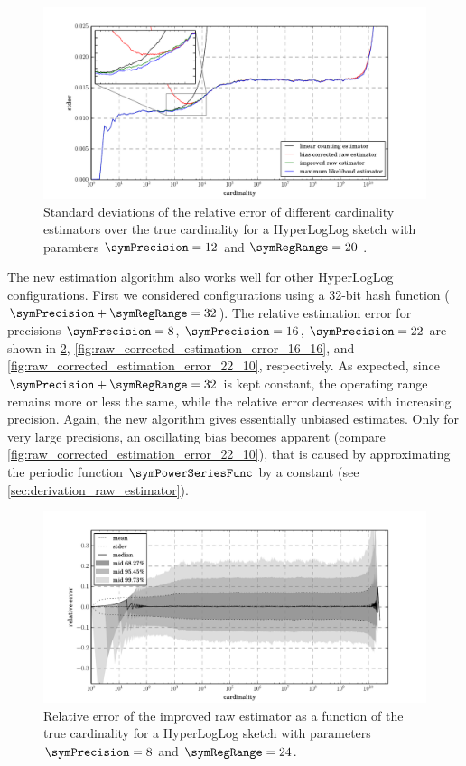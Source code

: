 \documentclass[a4paper]{scrartcl}
\begin{document}
\begin{figure}
\centering
\includegraphics[width=1\textwidth]{stdev_comparison}
\caption{Standard deviations of the relative error of different cardinality estimators over the true cardinality for a HyperLogLog sketch with paramters $\symPrecision = 12$ and $\symRegRange=20$ .}
\label{fig:stdev_comparison}
\end{figure}

The new estimation algorithm also works well for other HyperLogLog configurations. First we considered configurations using a 32-bit hash function ($\symPrecision + \symRegRange = 32$). The relative estimation error for precisions $\symPrecision=8$, $\symPrecision=16$, $\symPrecision=22$ are shown in \cref{fig:raw_corrected_estimation_error_8_24}, \cref{fig:raw_corrected_estimation_error_16_16}, and \cref{fig:raw_corrected_estimation_error_22_10}, respectively. As expected, since  $\symPrecision + \symRegRange = 32$ is kept constant, the operating range remains more or less the same, while the relative error decreases with increasing precision. Again, the new algorithm gives essentially unbiased estimates. Only for very large precisions, an oscillating bias becomes apparent (compare \cref{fig:raw_corrected_estimation_error_22_10}), that is caused by approximating the periodic function $\symPowerSeriesFunc$ by a constant (see \cref{sec:derivation_raw_estimator}).

\begin{figure}
\centering
\includegraphics[width=1\textwidth]{raw_corrected_estimate_8_24}
\caption{Relative error of the improved raw estimator as a function of the true cardinality for a HyperLogLog sketch with parameters $\symPrecision = 8$ and $\symRegRange=24$.}
\label{fig:raw_corrected_estimation_error_8_24}
\end{figure}
\end{document}
